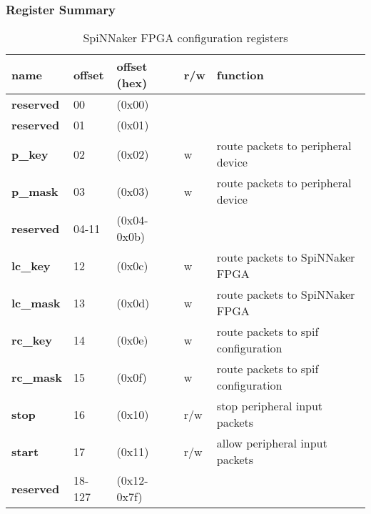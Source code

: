 \documentclass[11pt,a4paper,twoside]{article}
\begin{document}
\subsubsection*{Register Summary}


\begin{center}
\begin{table}[!h]
	\begin{tabularx}{\textwidth}{| p{34mm} p{13mm} p{21mm} p{7mm} X |}
		\hline
		\textbf{name} & \textbf{offset} & \textbf{offset} (hex) & \textbf{r/w} & \textbf{function} \\%
		\hline
		\hline
		\cellcolor{gray!25}\textbf{reserved} & \cellcolor{gray!25}00     & \cellcolor{gray!25}(0x00)       & \cellcolor{gray!25} & \cellcolor{gray!25}\\%
		\cellcolor{gray!25}\textbf{reserved} & \cellcolor{gray!25}01     & \cellcolor{gray!25}(0x01)       & \cellcolor{gray!25} & \cellcolor{gray!25}\\%
		\textbf{p\_key}                      & 02                        & (0x02)                          & w                   & route packets to peripheral device             \\%
		\textbf{p\_mask}                     & 03                        & (0x03)                          & w                   & route packets to peripheral device             \\%
		\cellcolor{gray!25}\textbf{reserved} & \cellcolor{gray!25}04-11  & \cellcolor{gray!25} (0x04-0x0b) & \cellcolor{gray!25} & \cellcolor{gray!25}\\%
		\textbf{lc\_key}                     & 12                        & (0x0c)                          & w                   & route packets to SpiNNaker FPGA  \\%
		\textbf{lc\_mask}                    & 13                        & (0x0d)                          & w                   & route packets to SpiNNaker FPGA  \\%
		\textbf{rc\_key}                     & 14                        & (0x0e)                          & w                   & route packets to spif configuration   \\%
		\textbf{rc\_mask}                    & 15                        & (0x0f)                          & w                   & route packets to spif configuration   \\%
		\textbf{stop}                        & 16                        & (0x10)                          & r/w                 & stop peripheral input packets         \\%
		\textbf{start}                       & 17                        & (0x11)                          & r/w                 & allow peripheral input packets         \\%
		\cellcolor{gray!25}\textbf{reserved} & \cellcolor{gray!25}18-127 & \cellcolor{gray!25} (0x12-0x7f) & \cellcolor{gray!25} & \cellcolor{gray!25}\\%
		\hline
	\end{tabularx}
	\caption{SpiNNaker FPGA configuration registers}
	\label{tab:spin_regs}
\end{table}
\end{center}
\end{document}
